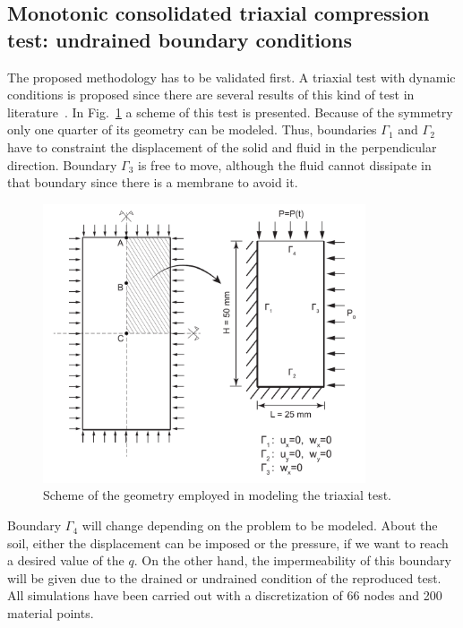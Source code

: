 \documentclass[preprint,12pt,a4paper]{elsarticle}
\begin{document}
\subsection{Monotonic consolidated triaxial compression test: undrained boundary conditions}
\label{sec:41}
The proposed methodology has to be validated first. A triaxial test with dynamic conditions is proposed since there are several results of this kind of test in literature~\cite{PastorZC:90,Zienkiewicz99}. In Fig.~\ref{fig_Geo} a scheme of this test is presented. Because of the symmetry only one quarter of its geometry can be modeled. Thus, boundaries $\Gamma_1$ and $\Gamma_2$ have to constraint the displacement of the solid and fluid in the perpendicular direction. Boundary $\Gamma_3$ is free to move, although the fluid cannot dissipate in that boundary since there is a membrane to avoid it.

\begin{figure}
\centering
\includegraphics[width=0.85\textwidth]{Figs/Geo.pdf}
\caption{Scheme of the geometry employed in modeling the triaxial test.}
\label{fig_Geo}
\end{figure}

Boundary $\Gamma_4$ will change depending on the problem to be modeled. About the soil, either the displacement can be imposed or the pressure, if we want to reach a desired value of the $q$. On the other hand, the impermeability of this boundary will be given due to the drained or undrained condition of the reproduced test. All simulations have been carried out with a discretization of 66 nodes and 200 material points.
\end{document}
